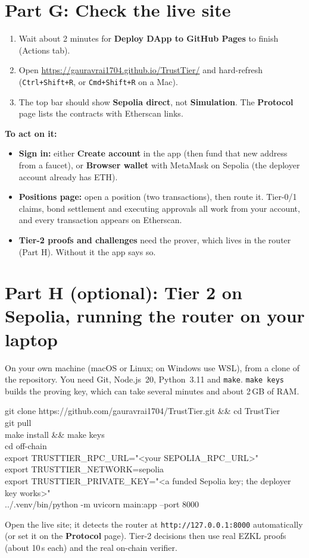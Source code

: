 \documentclass[11pt,a4paper]{article}
\newcommand{\ui}[1]{\textsf{\textbf{#1}}}
\newcommand{\code}[1]{\texttt{#1}}
\begin{document}
\section{Part G: Check the live site}
\begin{enumerate}
  \item Wait about 2 minutes for \ui{Deploy DApp to GitHub Pages} to finish (Actions tab).
  \item Open \url{https://gauravrai1704.github.io/TrustTier/} and hard-refresh (\code{Ctrl+Shift+R}, or \code{Cmd+Shift+R} on a Mac).
  \item The top bar should show \ui{Sepolia \textperiodcentered{} direct}, not \ui{Simulation}. The \ui{Protocol} page lists the contracts with Etherscan links.
\end{enumerate}
\textbf{To act on it:}
\begin{itemize}
  \item \textbf{Sign in:} either \ui{Create account} in the app (then fund that new address from a faucet), or \ui{Browser wallet} with MetaMask on Sepolia (the deployer account already has ETH).
  \item \textbf{Positions page:} open a position (two transactions), then route it. Tier-0/1 claims, bond settlement and executing approvals all work from your account, and every transaction appears on Etherscan.
  \item \textbf{Tier-2 proofs and challenges} need the prover, which lives in the router (Part H). Without it the app says so.
\end{itemize}

\section{Part H (optional): Tier 2 on Sepolia, running the router on your laptop}
On your own machine (macOS or Linux; on Windows use WSL), from a clone of the repository. You need Git, Node.js~20, Python~3.11 and \code{make}. \code{make keys} builds the proving key, which can take several minutes and about 2\,GB of RAM.
\begin{cmdbox}
git clone https://github.com/gauravrai1704/TrustTier.git \&\& cd TrustTier\\
git pull\\
make install \&\& make keys\\
cd off-chain\\
export TRUSTTIER\_RPC\_URL="<your SEPOLIA\_RPC\_URL>"\\
export TRUSTTIER\_NETWORK=sepolia\\
export TRUSTTIER\_PRIVATE\_KEY="<a funded Sepolia key; the deployer key works>"\\
../.venv/bin/python -m uvicorn main:app --port 8000
\end{cmdbox}
Open the live site; it detects the router at \code{http://127.0.0.1:8000} automatically (or set it on the \ui{Protocol} page). Tier-2 decisions then use real EZKL proofs (about 10\,s each) and the real on-chain verifier.
\end{document}
